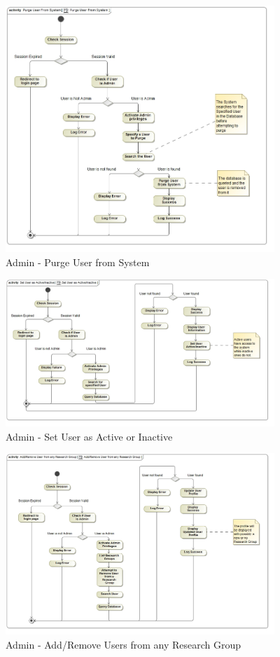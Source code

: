 \documentclass{article}
\begin{document}
			\begin{figure}[H]
				\includegraphics[width=4in, center]{../Diagrams/Process Specifications/Purge User From System.jpg}
				\caption{Admin - Purge User from System}
			\end{figure}
			\begin{figure}[H]
				\includegraphics[width=4in, center]{../Diagrams/Process Specifications/Set User as Active_Inactive.jpg}
				\caption{Admin - Set User as Active or Inactive}
			\end{figure}
			\begin{figure}[H]
				\includegraphics[width=4in, center]{../Diagrams/Process Specifications/Add_Remove User from any Research Group.jpg}
				\caption{Admin - Add/Remove Users from any Research Group}
			\end{figure}
\end{document}
